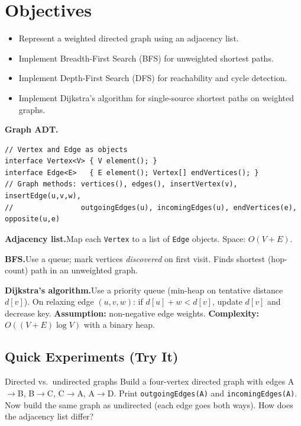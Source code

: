 \documentclass[11pt]{article}
\begin{document}
\labheader

\section*{Objectives}
\begin{itemize}[leftmargin=*,nosep]
  \item Represent a weighted directed graph using an adjacency list.
  \item Implement Breadth-First Search (BFS) for unweighted shortest paths.
  \item Implement Depth-First Search (DFS) for reachability and cycle detection.
  \item Implement Dijkstra's algorithm for single-source shortest paths on weighted graphs.
\end{itemize}

\begin{summary}
\textbf{Graph ADT.}
\begin{lstlisting}
// Vertex and Edge as objects
interface Vertex<V> { V element(); }
interface Edge<E>   { E element(); Vertex[] endVertices(); }
// Graph methods: vertices(), edges(), insertVertex(v), insertEdge(u,v,w),
//                outgoingEdges(u), incomingEdges(u), endVertices(e), opposite(u,e)
\end{lstlisting}

\textbf{Adjacency list.}\quad Map each \texttt{Vertex} to a list of \texttt{Edge} objects.
Space: $O(V + E)$.

\textbf{BFS.}\quad Use a queue; mark vertices \textit{discovered} on first visit.
Finds shortest (hop-count) path in an unweighted graph.

\textbf{Dijkstra's algorithm.}\quad Use a priority queue (min-heap on tentative distance $d[v]$).
On relaxing edge $(u,v,w)$: if $d[u]+w < d[v]$, update $d[v]$ and decrease key.
\textbf{Assumption:} non-negative edge weights.
\textbf{Complexity:} $O((V+E)\log V)$ with a binary heap.
\end{summary}

\subsection*{Quick Experiments (Try It)}

\begin{tryit}{Directed vs.\ undirected graphs}
Build a four-vertex directed graph with edges A$\to$B, B$\to$C, C$\to$A, A$\to$D.
Print \texttt{outgoingEdges(A)} and \texttt{incomingEdges(A)}.
Now build the same graph as undirected (each edge goes both ways).
How does the adjacency list differ?
\end{tryit}
\end{document}
